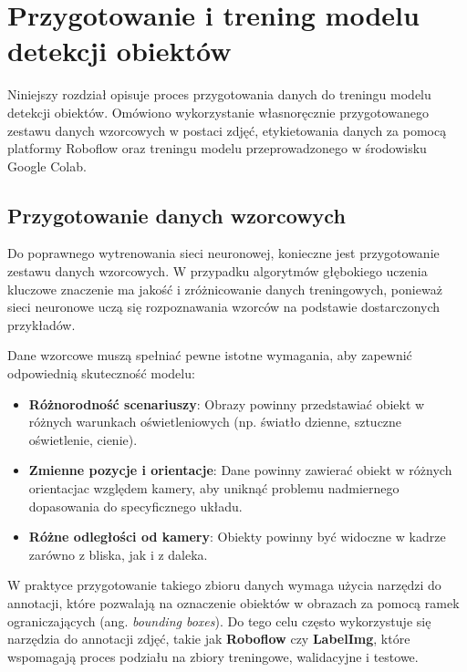 \documentclass[a4paper,twoside,12pt]{book}
\begin{document}




\chapter{Przygotowanie i trening modelu detekcji obiektów}
\label{ch:Przygotowanie-i-trening-modelu}
Niniejszy rozdział opisuje proces przygotowania danych do treningu modelu detekcji obiektów. Omówiono wykorzystanie własnoręcznie przygotowanego zestawu danych wzorcowych w postaci zdjęć, etykietowania danych za pomocą platformy Roboflow oraz treningu modelu przeprowadzonego w środowisku Google Colab.


\section{Przygotowanie danych wzorcowych}
Do poprawnego wytrenowania sieci neuronowej, konieczne jest przygotowanie zestawu danych wzorcowych. W przypadku algorytmów głębokiego uczenia kluczowe znaczenie ma jakość i zróżnicowanie danych treningowych, ponieważ sieci neuronowe uczą się rozpoznawania wzorców na podstawie dostarczonych przykładów. 

Dane wzorcowe muszą spełniać pewne istotne wymagania, aby zapewnić odpowiednią skuteczność modelu:
\begin{itemize}
    \item \textbf{Różnorodność scenariuszy}: Obrazy powinny przedstawiać obiekt w różnych warunkach oświetleniowych (np. światło dzienne, sztuczne oświetlenie, cienie).
    \item \textbf{Zmienne pozycje i orientacje}: Dane powinny zawierać obiekt w różnych orientacjac względem kamery, aby uniknąć problemu nadmiernego dopasowania do specyficznego układu.
    \item \textbf{Różne odległości od kamery}: Obiekty powinny być widoczne w kadrze zarówno z bliska, jak i z daleka.
\end{itemize}

\newpage

W praktyce przygotowanie takiego zbioru danych wymaga użycia narzędzi do annotacji, które pozwalają na oznaczenie obiektów w obrazach za pomocą ramek ograniczających (ang. \textit{bounding boxes}). Do tego celu często wykorzystuje się narzędzia do annotacji zdjęć, takie jak \textbf{Roboflow} czy \textbf{LabelImg}, które wspomagają proces podziału na zbiory treningowe, walidacyjne i testowe.


\end{document}
